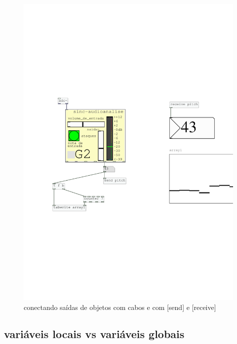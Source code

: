 \documentclass[draft]{ppgmus}
\begin{document}
\begin{figure}
\includegraphics[scale=.6]{ex-conexoes}
\caption{conectando saídas de objetos com cabos e com [send] e [receive]}
\label{ex-conexoes}
\end{figure}



\subsection{variáveis locais vs variáveis globais}
\end{document}
